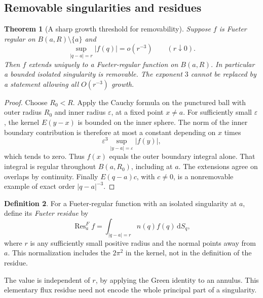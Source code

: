 \documentclass[11pt,a4paper]{article}
\numberwithin{equation}{section}
\newtheorem{theorem}{Theorem}[section]
\theoremstyle{definition}
\newtheorem{definition}[theorem]{Definition}
\theoremstyle{remark}
\newcommand{\Res}{\operatorname{Res}}
\newcommand{\dd}{\,\mathrm d}
\begin{document}
\subsection{Removable singularities and residues}
\begin{theorem}[A sharp growth threshold for removability]
\label{thm:fueter-removable}
Suppose $f$ is Fueter regular on $B(a,R)\setminus\{a\}$ and
\begin{equation}\label{eq:fueter-removable-growth}
 \sup_{|q-a|=r}|f(q)|=o(r^{-3})\qquad(r\downarrow0).
\end{equation}
Then $f$ extends uniquely to a Fueter-regular function on $B(a,R)$.
In particular a bounded isolated singularity is removable. The exponent
$3$ cannot be replaced by a statement allowing all $O(r^{-3})$ growth.
\end{theorem}
\begin{proof}
Choose $R_0<R$. Apply the Cauchy formula on the punctured ball with outer
radius $R_0$ and inner radius $\varepsilon$, at a fixed point $x\ne a$.
For sufficiently small $\varepsilon$, the kernel $E(y-x)$ is bounded on the
inner sphere. The norm of the inner boundary contribution is therefore at
most a constant depending on $x$ times
\[
 \varepsilon^3\sup_{|y-a|=\varepsilon}|f(y)|,
\]
which tends to zero. Thus $f(x)$ equals the outer boundary integral alone.
That integral is regular throughout $B(a,R_0)$, including at $a$. The
extensions agree on overlaps by continuity. Finally $E(q-a)c$, with
$c\ne0$, is a nonremovable example of exact order $|q-a|^{-3}$.
\end{proof}

\begin{definition}
For a Fueter-regular function with an isolated singularity at $a$, define
its \emph{Fueter residue} by
\begin{equation}\label{eq:fueter-residue}
 \Res^{F}_{a}f=\int_{|q-a|=r}n(q)f(q)\dd S_q,
\end{equation}
where $r$ is any sufficiently small positive radius and the normal points
away from $a$. This normalization includes the $2\pi^2$ in the kernel,
not in the definition of the residue.
\end{definition}
The value is independent of $r$, by applying the Green identity to an
annulus. This elementary flux residue need not encode the whole principal
part of a singularity.
\end{document}
